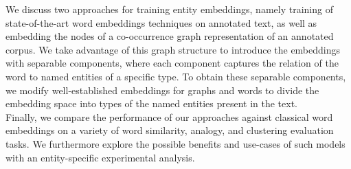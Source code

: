 We discuss two approaches for training entity embeddings, namely training of state-of-the-art word embeddings techniques on annotated text, as well as embedding the nodes of a co-occurrence graph representation of an annotated corpus. We take advantage of this graph structure to introduce the embeddings with separable components, where each component captures the relation of the word to named entities of a specific type. To obtain these separable components, we modify well-established embeddings for graphs and words to divide the embedding space into types of the named entities present in the text. \\
Finally, we compare the performance of our approaches against classical word embeddings on a variety of word similarity, analogy, and clustering evaluation tasks. We furthermore explore the possible benefits and use-cases of such models with an entity-specific experimental analysis. 


